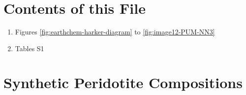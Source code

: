 \documentclass[draft]{agujournal2018}
\providecommand{\tightlist}{%
  \setlength{\itemsep}{0pt}\setlength{\parskip}{0pt}}
\providecommand{\tightlist}{\setlength{\itemsep}{0pt}\setlength{\parskip}{0pt}}
\def\tightlist{}
\begin{document}





%
%


\section*{Contents of this File}\label{contents-of-this-file}

\begin{enumerate}
\def\labelenumi{\arabic{enumi}.}
\tightlist
\item
  Figures \ref{fig:earthchem-harker-diagram} to \ref{fig:image12-PUM-NN3}
\item
  Tables S1
\end{enumerate}

\clearpage

\section*{Synthetic Peridotite Compositions}\label{synthetic-peridotite-compositions}
\end{document}
